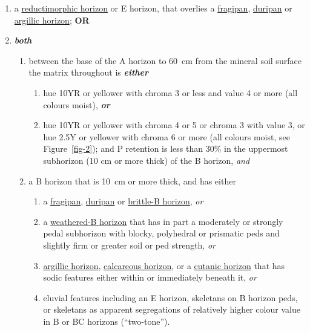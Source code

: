 \documentclass[
  letterpaper,
  DIV=11,
  numbers=noendperiod]{scrreprt}
\providecommand{\tightlist}{%
  \setlength{\itemsep}{0pt}\setlength{\parskip}{0pt}}\usepackage{longtable,booktabs,array}
\begin{document}
\begin{enumerate}
\def\labelenumi{\arabic{enumi}.}
\tightlist
\item
  a \protect\hyperlink{sec-diag-redmh}{reductimorphic horizon} or E
  horizon, that overlies a \protect\hyperlink{sec-diag-fpan}{fragipan},
  \protect\hyperlink{sec-diag-dpan}{duripan} or
  \protect\hyperlink{sec-diag-argh}{argillic horizon}; \textbf{OR}
\item
  \textbf{\emph{both}}

  \begin{enumerate}
  \def\labelenumii{(\alph{enumii})}
  \tightlist
  \item
    between the base of the A horizon to 60~cm from the mineral soil
    surface the matrix throughout is \textbf{\emph{either}}

    \begin{enumerate}
    \def\labelenumiii{(\roman{enumiii})}
    \tightlist
    \item
      hue 10YR or yellower with chroma 3 or less and value 4 or more
      (all colours moist), \textbf{\emph{or}}
    \item
      hue 10YR or yellower with chroma 4 or 5 or chroma 3 with value 3,
      or hue 2.5Y or yellower with chroma 6 or more (all colours moist,
      see Figure~\ref{fig-2}); and P retention is less than 30\% in the
      uppermost subhorizon (10 cm or more thick) of the B horizon,
      \emph{and}
    \end{enumerate}
  \item
    a B horizon that is 10~cm or more thick, and has either

    \begin{enumerate}
    \def\labelenumiii{(\roman{enumiii})}
    \tightlist
    \item
      a \protect\hyperlink{sec-diag-fpan}{fragipan},
      \protect\hyperlink{sec-diag-dpan}{duripan} or
      \protect\hyperlink{sec-diag-britb}{brittle-B horizon}, \emph{or}
    \item
      a \protect\hyperlink{sec-diag-bw}{weathered-B horizon} that has in
      part a moderately or strongly pedal subhorizon with blocky,
      polyhedral or prismatic peds and slightly firm or greater soil or
      ped strength, \emph{or}
    \item
      \protect\hyperlink{sec-diag-argh}{argillic horizon},
      \protect\hyperlink{sec-diag-calch}{calcareous horizon}, or a
      \protect\hyperlink{sec-diag-cuth}{cutanic horizon} that has sodic
      features either within or immediately beneath it, \emph{or}
    \item
      eluvial features including an E horizon, skeletans on B horizon
      peds, or skeletans as apparent segregations of relatively higher
      colour value in B or BC horizons (``two-tone'').
    \end{enumerate}
  \end{enumerate}
\end{enumerate}
\end{document}
